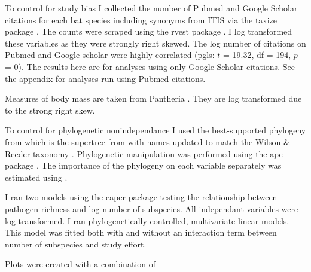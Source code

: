 To control for study bias I collected the number of Pubmed and Google Scholar citations for each bat species including synonyms from ITIS \cite{itis} via the taxize package \cite{chamberlain2013taxize}.
The counts were scraped using the rvest package \cite{rvest}.
I log transformed these variables as they were strongly right skewed.
The log number of citations on Pubmed and Google scholar were highly correlated (pgls: $t$ = 19.32, df = 194, $p$ = 0).
The results here are for analyses using only Google Scholar citations.
See the appendix for analyses run using Pubmed citations.

Measures of body mass are taken from Pantheria \cite{jones2009pantheria}.
They are log transformed due to the strong right skew.




To control for phylogenetic nonindependance I used the best-supported phylogeny from \cite{fritz2009geographical} which is the supertree from \cite{bininda2007delayed} with names updated to match the Wilson \& Reeder taxonomy \cite{wilson2005mammal}.
Phylogenetic manipulation was performed using the ape package \cite{ape}.
The importance of the phylogeny on each variable separately was estimated using \cite{phytools}.

I ran two models using the caper package \cite{caper} testing the relationship between pathogen richness and log number of subspecies.
All independant variables were log transformed.
I ran phylogenetically controlled, multivariate linear models.
This model was fitted both with and without an interaction term between number of subspecies and study effort.

Plots were created with a combination of \cite{ggplot2, palettetown, dotwhisker, ggtree}












